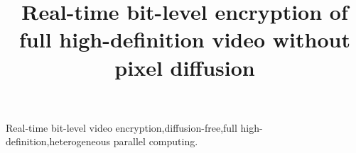 \documentclass[final,5p,times,twocolumn]{elsarticle}
\begin{document}
\begin{frontmatter}



\title{Real-time bit-level encryption of full high-definition video without pixel diffusion}







\begin{abstract}

\end{abstract}


\begin{keyword}
Real-time bit-level video encryption\sep diffusion-free\sep full high-definition\sep heterogeneous parallel computing.



\end{keyword}

\end{frontmatter}


\end{document}
